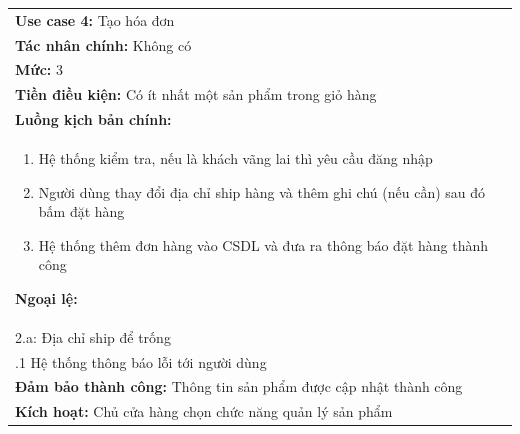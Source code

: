 \begin{center}
	\begin{tabularx}{\linewidth}{|X|}
		\cline{1-2}
		\textbf{Use case 4:} Tạo hóa đơn                                         \\
		\textbf{Tác nhân chính:} Không có                                        \\
		\textbf{Mức:} 3                                                          \\
		\textbf{Tiền điều kiện:} Có ít nhất một sản phẩm trong giỏ hàng          \\
		\textbf{Luồng kịch bản chính:}                                           \\
		\begin{enumerate}
			\vspace{-2em}
			\itemsep-0.5em
			\item Hệ thống kiểm tra, nếu là khách vãng lai thì yêu cầu đăng nhập
			\item Người dùng thay đổi địa chỉ ship hàng và thêm ghi chú (nếu cần) sau đó bấm đặt hàng
			\item Hệ thống thêm đơn hàng vào CSDL và đưa ra thông báo đặt hàng thành công
			      \vspace{-1em}
		\end{enumerate}
		\textbf{Ngoại lệ:}                                                       \\
		\hspace{1em}2.a: Địa chỉ ship để trống                                   \\
		\hspace{2.5em}.1 Hệ thống thông báo lỗi tới người dùng                   \\
		\textbf{Đảm bảo thành công:} Thông tin sản phẩm được cập nhật thành công \\
		\textbf{Kích hoạt:} Chủ cửa hàng chọn chức năng quản lý sản phẩm
		\cline{1-2}
	\end{tabularx}
\end{center}

